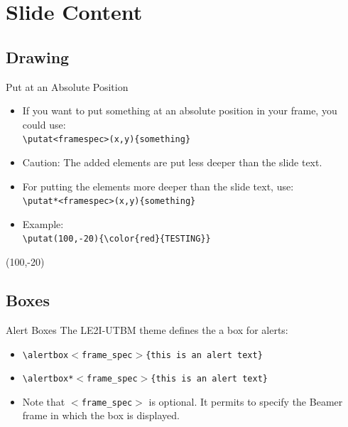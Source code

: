 \documentclass[english,sectioncirclenumberstyle]{le2iutbmbeamer}
\begin{document}
\section{Slide Content}
\tableofcontentslide[sectionstyle={show/shaded},subsectionstyle={show/show/hide},subsubsectionstyle={hide/hide/hide/hide},sections={3-}]

\subsection{Drawing}
\tableofcontentslide[sectionstyle={show/shaded},subsectionstyle={show/shaded/hide},subsubsectionstyle={hide/hide/hide/hide},sections={3-}]

\begin{frame}{Put at an Absolute Position}
	\begin{itemize}
	\item If you want to put something at an absolute position in your frame, you could use: \\
		\texttt{{\textbackslash}putat<framespec>(x,y)\{something\}}
	\item \alert{Caution: The added elements are put less deeper than the slide text.}
	\item For putting the elements more deeper than the slide text, use: \\
		\texttt{{\textbackslash}putat*<framespec>(x,y)\{something\}}
	\vspace{1em}
	\item Example: \\
		\texttt{{\textbackslash}putat(100,-20)\{{\textbackslash}color\{red\}\{TESTING\}\}}
	\end{itemize}
	\putat(100,-20){\color{red}{TESTING}}
\end{frame}

\subsection{Boxes}
\tableofcontentslide[sectionstyle={show/shaded},subsectionstyle={show/shaded/hide},subsubsectionstyle={hide/hide/hide/hide},sections={3-}]

\begin{frame}{Alert Boxes}
	The LE2I-UTBM theme defines the a box for alerts: \\
	\begin{itemize}
	\item \texttt{{\textbackslash}alertbox\ensuremath{<}frame\_spec\ensuremath{>}\{this is an alert text\}} \\[.5cm]
		\vspace{1cm}
	\item \texttt{{\textbackslash}alertbox*\ensuremath{<}frame\_spec\ensuremath{>}\{this is an alert text\}} \\[.5cm]
	\item Note that \texttt{\ensuremath{<}frame\_spec\ensuremath{>}} is optional. It permits to specify the Beamer frame in which the box is displayed.
	\end{itemize}
\end{frame}
\end{document}
